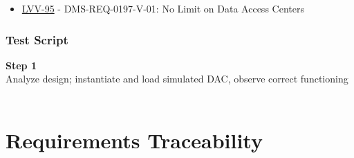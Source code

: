 \begin{itemize}
\tightlist
\item
  \href{https://jira.lsstcorp.org/browse/LVV-95}{LVV-95} -
  DMS-REQ-0197-V-01: No Limit on Data Access Centers
\end{itemize}

\hypertarget{test-script-189}{%
\subsubsection{Test Script}\label{test-script-189}}

\textbf{Step 1}\\
Analyze design; instantiate and load simulated DAC, observe correct
functioning\\
~\\

\hypertarget{requirements-traceability}{%
\section{Requirements Traceability}\label{requirements-traceability}}

